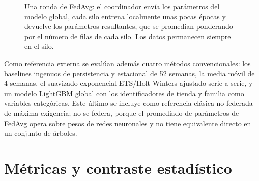 \begin{figure}[H]
  \centering
  \caption[Esquema de una ronda de entrenamiento federado]{Una ronda de FedAvg: el coordinador
  envía los parámetros del modelo global, cada silo entrena localmente unas pocas épocas y devuelve
  los parámetros resultantes, que se promedian ponderando por el número de filas de cada silo. Los
  datos permanecen siempre en el silo.}
  \label{fig:esquema_federado}
\end{figure}

Como referencia externa se evalúan además cuatro métodos convencionales: los baselines ingenuos de
persistencia y estacional de 52 semanas, la media móvil de 4 semanas, el suavizado exponencial
ETS/Holt-Winters ajustado serie a serie, y un modelo LightGBM global con los identificadores de
tienda y familia como variables categóricas. Este último se incluye como referencia clásica no
federada de máxima exigencia; no se federa, porque el promediado de parámetros de FedAvg opera
sobre pesos de redes neuronales y no tiene equivalente directo en un conjunto de árboles.

\section{Métricas y contraste estadístico}

